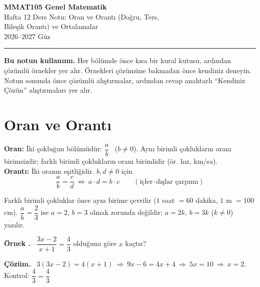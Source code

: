 \documentclass[11pt,a4paper]{article}
\newcounter{ornek}
\newenvironment{ornek}{\refstepcounter{ornek}\par\medskip\needspace{7\baselineskip}\noindent\textbf{\color{anamavi}Örnek \theornek.}\ }{\par}
\newenvironment{cozum}{\begin{tcolorbox}[colback=cozumyesil!6,colframe=cozumyesil,boxrule=0.5pt,left=4pt,right=4pt,top=2pt,bottom=2pt,breakable]\textbf{\color{cozumyesil}Çözüm.}\ }{\end{tcolorbox}}
\begin{document}
\begin{minipage}[c]{\textwidth}
{\LARGE\bfseries\color{anamavi} MMAT105 Genel Matematik}\\[4pt]
{\large Hafta 12 Ders Notu: Oran ve Orantı (Doğru, Ters,\\ Bileşik Orantı) ve Ortalamalar}\\[6pt]
{\small 2026--2027 Güz}
\end{minipage}

\vspace{4pt}\noindent\textcolor{anamavi}{\rule{\textwidth}{1pt}}

\textbf{Bu notun kullanımı.} Her bölümde önce kısa bir kural kutusu, ardından çözümlü örnekler yer alır. Örnekleri çözümüne bakmadan önce kendiniz deneyin. Notun sonunda önce çözümlü alıştırmalar, ardından cevap anahtarlı ``Kendiniz Çözün'' alıştırmaları yer alır.

\section{Oran ve Orantı}

\begin{kural}[Tanımlar]
\textbf{Oran:} İki çokluğun bölümüdür: \(\dfrac{a}{b}\) \ (\(b\neq 0\)). Aynı birimli çoklukların oranı birimsizdir; farklı birimli çoklukların oranı birimlidir (ör. hız, km/sa).\\
\textbf{Orantı:} İki oranın eşitliğidir. \(b,d\neq 0\) için
\[\frac{a}{b}=\frac{c}{d}\ \Longleftrightarrow\ a\cdot d=b\cdot c\qquad(\text{içler--dışlar çarpımı})\]
\end{kural}

\begin{dikkat}
Farklı birimli çokluklar önce aynı birime çevrilir (\(1\) saat \(=60\) dakika, \(1\) m \(=100\) cm). \(\dfrac{a}{b}=\dfrac{2}{3}\) ise \(a=2\), \(b=3\) olmak zorunda değildir; \(a=2k\), \(b=3k\) (\(k\neq 0\)) yazılır.
\end{dikkat}

\begin{ornek}
\(\dfrac{3x-2}{x+1}=\dfrac{4}{3}\) olduğuna göre \(x\) kaçtır?
\end{ornek}
\begin{cozum}
\(3(3x-2)=4(x+1)\ \Rightarrow\ 9x-6=4x+4\ \Rightarrow\ 5x=10\ \Rightarrow\ x=2\). \quad Kontrol: \(\dfrac{4}{3}=\dfrac{4}{3}\) \checkmark
\end{cozum}
\end{document}
